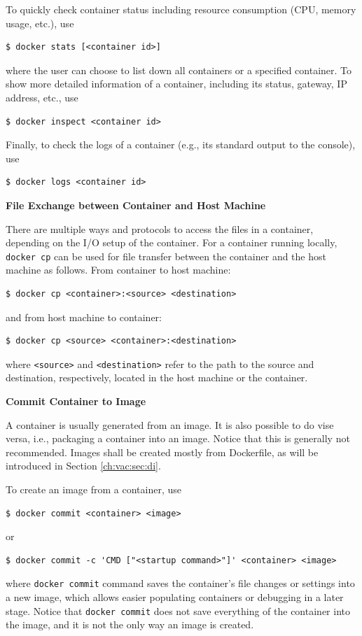 To quickly check container status including resource consumption (CPU, memory usage, etc.), use
\begin{lstlisting}
$ docker stats [<container id>]
\end{lstlisting}
where the user can choose to list down all containers or a specified container. To show more detailed information of a container, including its status, gateway, IP address, etc., use
\begin{lstlisting}
$ docker inspect <container id>
\end{lstlisting}
Finally, to check the logs of a container (e.g., its standard output to the console), use
\begin{lstlisting}
$ docker logs <container id>
\end{lstlisting}

\vspace{0.1in}
\noindent \textbf{File Exchange between Container and Host Machine}
\vspace{0.1in}

There are multiple ways and protocols to access the files in a container, depending on the I/O setup of the container. For a container running locally, \verb|docker cp| can be used for file transfer between the container and the host machine as follows. From container to host machine:
\begin{lstlisting}
$ docker cp <container>:<source> <destination>
\end{lstlisting}
and from host machine to container:
\begin{lstlisting}
$ docker cp <source> <container>:<destination>
\end{lstlisting}
where \verb|<source>| and \verb|<destination>| refer to the path to the source and destination, respectively, located in the host machine or the container.

\vspace{0.1in}
\noindent \textbf{Commit Container to Image}
\vspace{0.1in}

A container is usually generated from an image. It is also possible to do vise versa, i.e., packaging a container into an image. Notice that this is generally not recommended. Images shall be created mostly from Dockerfile, as will be introduced in Section \ref{ch:vac:sec:di}. 

To create an image from a container, use
\begin{lstlisting}
$ docker commit <container> <image>
\end{lstlisting}
or
\begin{lstlisting}
$ docker commit -c 'CMD ["<startup command>"]' <container> <image>
\end{lstlisting}
where \verb|docker commit| command saves the container's file changes or settings into a new image, which allows easier populating containers or debugging in a later stage. Notice that \verb|docker commit| does not save everything of the container into the image, and it is not the only way an image is created.

